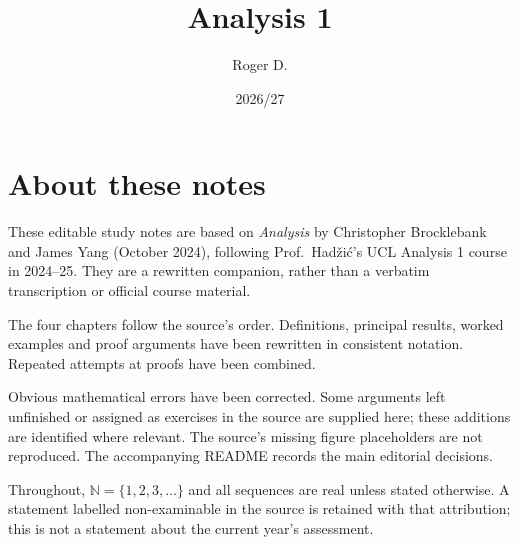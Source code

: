 \documentclass[11pt,a4paper,oneside]{report}
\title{Analysis 1\\[0.4em]\large}
\author{Roger D.}
\date{2026/27}
\theoremstyle{definition}
\theoremstyle{remark}
\numberwithin{equation}{chapter}
\begin{document}
\maketitle
{}
\chapter*{About these notes}
These editable study notes are based on \emph{Analysis} by Christopher
Brocklebank and James Yang (October 2024), following Prof.~Had\v zi\'c's
UCL Analysis 1 course in 2024--25. They are a rewritten companion, rather
than a verbatim transcription or official course material.

The four chapters follow the source's order. Definitions, principal results,
worked examples and proof arguments have been rewritten in consistent notation.
Repeated attempts at proofs have been combined.

Obvious mathematical errors have been corrected. Some arguments left unfinished
or assigned as exercises in the source are supplied here; these additions are
identified where relevant. The source's missing figure placeholders are not
reproduced. The accompanying README records the main editorial decisions.

Throughout, $\mathbb N=\{1,2,3,\ldots\}$ and all sequences are real unless stated
otherwise. A statement labelled non-examinable in the source is retained with
that attribution; this is not a statement about the current year's assessment.
\tableofcontents
\clearpage
{}




\end{document}
